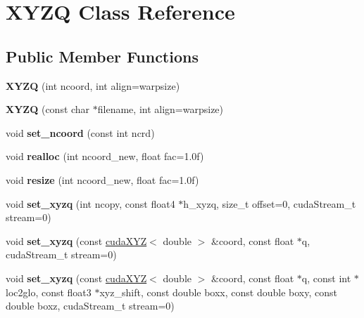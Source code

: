 \hypertarget{classXYZQ}{}\section{X\+Y\+ZQ Class Reference}
\label{classXYZQ}
\subsection*{Public Member Functions}
\begin{DoxyCompactItemize}
\item 
\hypertarget{classXYZQ_ac952868df5c6443d1bbbd1fdd1df48cf}{}\label{classXYZQ_ac952868df5c6443d1bbbd1fdd1df48cf} 
{\bfseries X\+Y\+ZQ} (int ncoord, int align=warpsize)
\item 
\hypertarget{classXYZQ_a14dba782e7793407478ad97bc62219ad}{}\label{classXYZQ_a14dba782e7793407478ad97bc62219ad} 
{\bfseries X\+Y\+ZQ} (const char $\ast$filename, int align=warpsize)
\item 
\hypertarget{classXYZQ_a8c52a476e3a374075572596a80baba7e}{}\label{classXYZQ_a8c52a476e3a374075572596a80baba7e} 
void {\bfseries set\+\_\+ncoord} (const int ncrd)
\item 
\hypertarget{classXYZQ_ab81af48d3d75d04ef5aee908c53f41cc}{}\label{classXYZQ_ab81af48d3d75d04ef5aee908c53f41cc} 
void {\bfseries realloc} (int ncoord\+\_\+new, float fac=1.\+0f)
\item 
\hypertarget{classXYZQ_a7d2d9d0066070c8d9ba650e4a952e7c1}{}\label{classXYZQ_a7d2d9d0066070c8d9ba650e4a952e7c1} 
void {\bfseries resize} (int ncoord\+\_\+new, float fac=1.\+0f)
\item 
\hypertarget{classXYZQ_aa429168e6b1fd60eb5eb3fe2994cbe73}{}\label{classXYZQ_aa429168e6b1fd60eb5eb3fe2994cbe73} 
void {\bfseries set\+\_\+xyzq} (int ncopy, const float4 $\ast$h\+\_\+xyzq, size\+\_\+t offset=0, cuda\+Stream\+\_\+t stream=0)
\item 
\hypertarget{classXYZQ_a64a2f7a04044cc0f98450db7b240b927}{}\label{classXYZQ_a64a2f7a04044cc0f98450db7b240b927} 
void {\bfseries set\+\_\+xyzq} (const \hyperlink{classcudaXYZ}{cuda\+X\+YZ}$<$ double $>$ \&coord, const float $\ast$q, cuda\+Stream\+\_\+t stream=0)
\item 
\hypertarget{classXYZQ_af930e9c6a44ec965b95972b5305ca3d4}{}\label{classXYZQ_af930e9c6a44ec965b95972b5305ca3d4} 
void {\bfseries set\+\_\+xyzq} (const \hyperlink{classcudaXYZ}{cuda\+X\+YZ}$<$ double $>$ \&coord, const float $\ast$q, const int $\ast$loc2glo, const float3 $\ast$xyz\+\_\+shift, const double boxx, const double boxy, const double boxz, cuda\+Stream\+\_\+t stream=0)

\end{DoxyCompactItemize}

